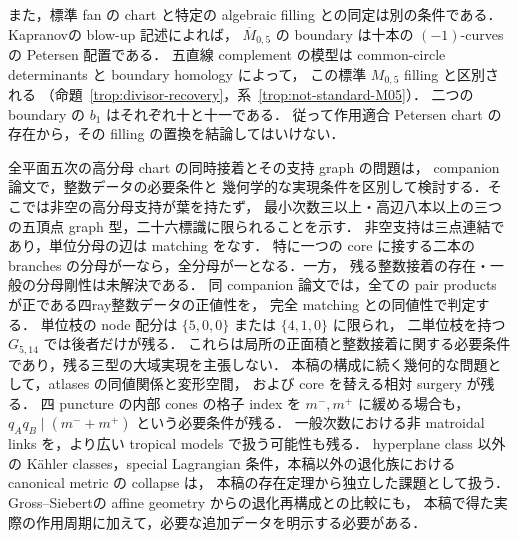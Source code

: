 また，標準 fan の chart と特定の algebraic filling との同定は別の条件である．
Kapranov\cite[Theorem~4.3.3]{KapranovChow}の blow-up 記述によれば，
$\overline M_{0,5}$ の boundary は十本の $(-1)$-curves の Petersen 配置である．
五直線 complement の模型は common-circle determinants と boundary homology によって，
この標準 $M_{0,5}$ filling と区別される
（命題~\ref{trop:divisor-recovery}，系~\ref{trop:not-standard-M05}）．
二つの boundary の $b_1$ はそれぞれ十と十一である．
従って作用適合 Petersen chart の存在から，その filling の置換を結論してはいけない．

全平面五次の高分母 chart の同時接着とその支持 graph の問題は，
companion 論文\cite{QuinticArithmetic}で，整数データの必要条件と
幾何学的な実現条件を区別して検討する．そこでは非空の高分母支持が葉を持たず，
最小次数三以上・高辺八本以上の三つの五頂点 graph 型，二十六標識に限られることを示す．
非空支持は三点連結であり，単位分母の辺は matching をなす．
特に一つの core に接する二本の branches の分母が一なら，全分母が一となる．一方，
残る整数接着の存在・一般の分母剛性は未解決である．
同 companion 論文では，全ての pair products が正である四ray整数データの正値性を，
完全 matching との同値性で判定する．
単位枝の node 配分は $\{5,0,0\}$ または $\{4,1,0\}$ に限られ，
二単位枝を持つ $G_{5,14}$ では後者だけが残る．
これらは局所の正面積と整数接着に関する必要条件であり，残る三型の大域実現を主張しない．
本稿の構成に続く幾何的な問題として，atlases の同値関係と変形空間，
および core を替える相対 surgery が残る．
四 puncture の内部 cones の格子 index を $m^-,m^+$ に緩める場合も，
$q_Aq_B\mid(m^-+m^+)$ という必要条件が残る．
一般次数における非 matroidal links を，より広い tropical models で扱う可能性も残る．
hyperplane class 以外の Kähler classes，special Lagrangian 条件，本稿以外の退化族における canonical metric の collapse は，
本稿の存在定理から独立した課題として扱う．
Gross--Siebert\cite{GrossSiebert}の affine geometry からの退化再構成との比較にも，
本稿で得た実際の作用周期に加えて，必要な追加データを明示する必要がある．
